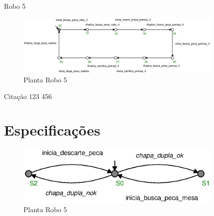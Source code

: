 Robo 5
\lipsum[5]
\begin{figure}[H]%
    \centering
    \includegraphics[width=0.9\textwidth]{imagens/robo_5.eps}
    \caption{Planta Robo 5}\label{fig:robo5}
\end{figure}

\lipsum[6]

Citação \cite{bib1} 123 456

\lipsum[7]

\section{Especificações}
\lipsum[1]
\begin{figure}[H]%
    \centering
    \includegraphics[width=0.9\textwidth]{imagens/E1_robo_1_chapa_dupla.eps}
    \caption{Planta Robo 5}\label{fig:robo5}
\end{figure}
